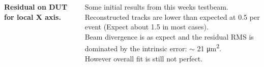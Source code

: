 \documentclass{beamer}
\begin{document}
\begin{frame}
\begin{columns}[t]
\tiny{\textbf{Residual on DUT for local X axis.}}

\tiny{
\vspace{10pt}
Some initial results from this weeks testbeam. \\
\vspace{10pt}
Reconstructed tracks are lower than expected at 0.5 per event (Expect about 1.5 in most cases).\\
\vspace{10pt}
Beam divergence is as expect and the residual RMS is dominated by the intrinsic error: $\sim$ 21 \si{\micro\metre\squared}.\\
\vspace{10pt}
However overall fit is still not perfect.
}

\end{columns}
\end{frame}
\end{document}
